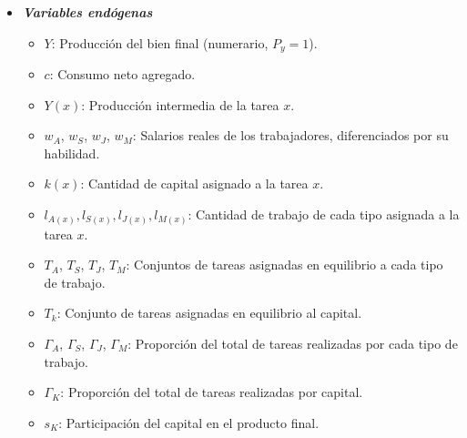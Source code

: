 \documentclass{article}
\theoremstyle{remark}
\theoremstyle{definition}
\begin{document}
\begin{enumerate}
\begin{tcolorbox}[title= Soluci\'on 3]
\begin{itemize}
                \item {\textbf{\textit{Variables end\'ogenas}}}
                    \begin{itemize}
                        \item $Y$: Producci\'on del bien final (numerario, $P_y=1$).
                        \item $c$: Consumo neto agregado.
                        \item $Y(x)$: Producci\'on intermedia de la tarea $x$.
                        \item $w_A$, $w_S$, $w_J$, $w_M$: Salarios reales de los trabajadores, diferenciados por su habilidad.
                        \item $k(x)$: Cantidad de capital asignado a la tarea $x$.
                        \item $l_{A(x)}, l_{S(x)}, l_{J(x)}, l_{M(x)}$: Cantidad de trabajo de cada tipo asignada a la tarea $x$.
                        \item $T_A$, $T_S$, $T_J$, $T_M$: Conjuntos de tareas asignadas en equilibrio a cada tipo de trabajo.
                        \item $T_k$: Conjunto de tareas asignadas en equilibrio al capital.
                        \item $\Gamma_A$, $\Gamma_S$, $\Gamma_J$, $\Gamma_M$: Proporci\'on del total de tareas realizadas por cada tipo de trabajo.
                        \item $\Gamma_K$: Proporci\'on del total de tareas realizadas por capital.
                        \item $s_K$: Participaci\'on del capital en el producto final.
                    \end{itemize}
                    

\end{itemize}
\end{tcolorbox}
\end{enumerate}
\end{document}
